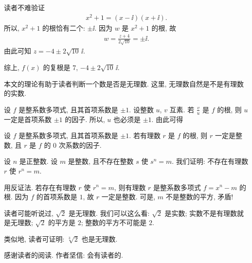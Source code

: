 \begin{example}
    读者不难验证
    \begin{align*}
        x^2 + 1 = (x - \ii) (x + \ii).
    \end{align*}
    所以, $x^2 + 1$ 的根恰有二个: $\pm \ii$. 因为 $w$ 是 $x^2 + 1$ 的根, 故
    \begin{align*}
        w = \frac{z + 4}{2\sqrt{10}} = \pm \ii.
    \end{align*}
    由此可知 $z = -4 \pm 2\sqrt{10}\,\ii$.

    综上, $f(x)$ 的复根是 $7$, $-4 \pm 2\sqrt{10}\,\ii$.
\end{example}

\myLine

本文的理论有助于读者判断一个数是否是无理数. 这里, 无理数自然是不是有理数的实数.

设 $f$ 是整系数多项式, 且其首项系数是 $\pm 1$. 设整数 $u$, $v$ 互素. 若 $\frac{v}{u}$ 是 $f$ 的根, 则 $u$ 一定是首项系数 $\pm 1$ 的因子. 所以, $u$ 也必须是 $\pm 1$. 由此可得
\begin{proposition}
    设 $f$ 是整系数多项式, 且其首项系数是 $\pm 1$. 若有理数 $r$ 是 $f$ 的根, 则 $r$ 一定是整数, 且 $r$ 是 $f$ 的 $0$ 次系数的因子.
\end{proposition}

\begin{example}
    设 $n$ 是正整数. 设 $m$ 是整数, 且不存在整数 $s$ 使 $s^n = m$. 我们证明: 不存在有理数 $r$ 使 $r^n = m$.

    用反证法. 若存在有理数 $r$ 使 $r^n = m$, 则有理数 $r$ 是整系数多项式 $f = x^n - m$ 的根. 因为 $f$ 的首项系数是 $1$, 故 $r$ 一定是整数. 可是, $m$ 不是整数的平方, 矛盾!

    读者可能听说过, $\sqrt{2}$ 是无理数. 我们可以这么看: $\sqrt{2}$ 是实数; 实数不是有理数就是无理数; $\sqrt{2}$ 的平方是 $2$; 整数的平方不可能是 $2$.

    类似地, 读者可证明: $\sqrt[3]{2}$ 也是无理数.
\end{example}

感谢读者的阅读. 作者坚信: 会有读者的.
